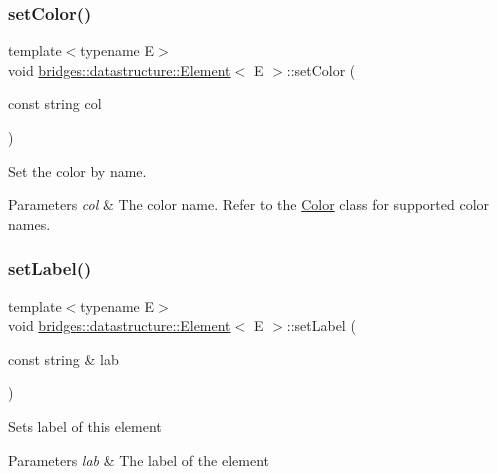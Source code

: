 \subsubsection{\texorpdfstring{set\+Color()}{setColor()}\hspace{0.1cm}{\footnotesize\ttfamily [2/2]}}
{\footnotesize\ttfamily template$<$typename E$>$ \\
void \mbox{\hyperlink{classbridges_1_1datastructure_1_1_element}{bridges\+::datastructure\+::\+Element}}$<$ E $>$\+::set\+Color (\begin{DoxyParamCaption}\item[{const string}]{col }\end{DoxyParamCaption})\hspace{0.3cm}{\ttfamily [inline]}}



Set the color by name. 


\begin{DoxyParams}{Parameters}
{\em col} & The color name. Refer to the \mbox{\hyperlink{classbridges_1_1datastructure_1_1_color}{Color}} class for supported color names. \\
\hline
\end{DoxyParams}
\mbox{\label{classbridges_1_1datastructure_1_1_element_a3a1fe4e3aa100125710c30f6e401e8c3}} 
\subsubsection{\texorpdfstring{set\+Label()}{setLabel()}}
{\footnotesize\ttfamily template$<$typename E$>$ \\
void \mbox{\hyperlink{classbridges_1_1datastructure_1_1_element}{bridges\+::datastructure\+::\+Element}}$<$ E $>$\+::set\+Label (\begin{DoxyParamCaption}\item[{const string \&}]{lab }\end{DoxyParamCaption})\hspace{0.3cm}{\ttfamily [inline]}}

Sets label of this element


\begin{DoxyParams}{Parameters}
{\em lab} & The label of the element \\
\hline
\end{DoxyParams}
\mbox{\label{classbridges_1_1datastructure_1_1_element_af3af017c9d6efcbc2124d0231b57e7a6}} 
